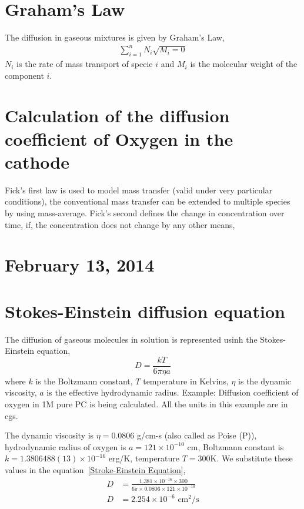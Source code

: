 \documentclass[12pt]{book}
\begin{document}
\section{Graham's Law}
The diffusion in gaseous mixtures is given by Graham's Law,
\begin{align}
\sum_{i=1}^{n}N_i\sqrt{M_i=0}
\end{align}
$N_i$ is the rate of mass transport of specie $i$ and $M_i$ is the molecular weight of the component $i$.
\section{Calculation of the diffusion coefficient of Oxygen in the cathode}
Fick's first law is used to model mass transfer (valid under very particular conditions), the conventional mass transfer can be extended to multiple species by using mass-average. Fick's second defines the change in concentration over time, if, the concentration does not change by any other means, 
\section*{February 13, 2014}
\section{Stokes-Einstein diffusion equation}
The diffusion of gaseous molecules in solution is represented usinh the Stokes-Einstein equation\cite{Lu2011b}, 
\begin{equation}
D=\frac{kT}{6\pi\eta a}
\label{Stroke-Einstein Equation}
\end{equation}
where $k$ is the Boltzmann constant, $T$ temperature in Kelvins, $\eta$ is the dynamic viscosity, $a$ is the effective hydrodynamic radius.
Example: Diffusion coefficient of oxygen in 1M pure PC is being calculated. All the units in this example are in cgs.

 The dynamic viscosity is $\eta=0.0806$ g/cm-s (also called as Poise (P)), hydrodynamic radius of oxygen is $a=121\times 10^{-10}$ cm, Boltzmann constant is $k=1.3806488(13)\times 10^{-16}$ erg/K, temperature $T=300$K.
 We substitute these values in the equation~\ref{Stroke-Einstein Equation},
\begin{align}
D&=\frac{1.381\times 10^{-16} \times 300}{6\pi\times 0.0806\times 121\times 10^{-10}}\nonumber\\
D&=2.254\times 10^{-6} \textrm{ cm}^2/\textrm{s}
\end{align}
\end{document}
